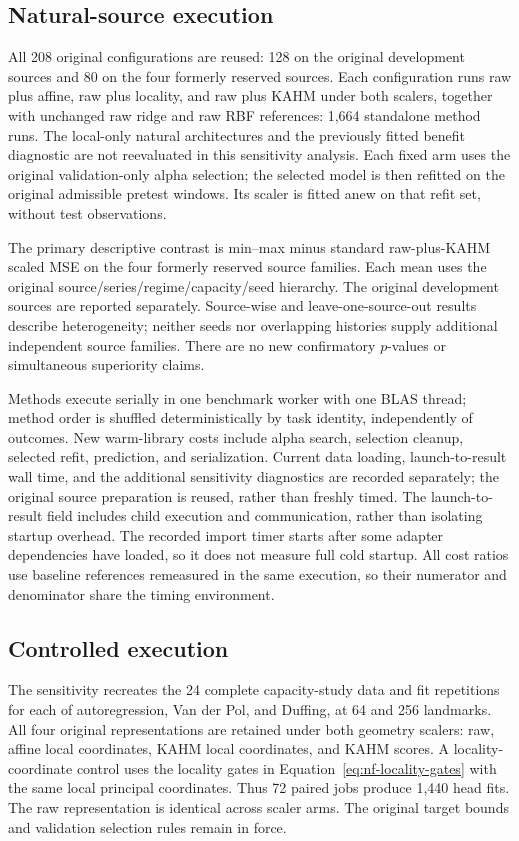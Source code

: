 \subsection{Natural-source execution}
All 208 original configurations are reused: 128 on the original development
sources and 80 on the four formerly reserved sources. Each configuration runs
raw plus affine, raw plus locality, and raw plus KAHM under both scalers,
together with unchanged raw ridge and raw RBF references: 1,664 standalone
method runs. The local-only natural architectures and the previously fitted benefit diagnostic are not reevaluated in this
sensitivity analysis. Each fixed arm uses the
original validation-only alpha selection; the selected model is then refitted
on the original admissible pretest windows. Its scaler is fitted anew on that
refit set, without test observations.

The primary descriptive contrast is min--max minus standard raw-plus-KAHM
scaled MSE on the four formerly reserved source families. Each mean uses the
original source/series/regime/capacity/seed hierarchy. The original development
sources are reported separately. Source-wise and leave-one-source-out results
describe heterogeneity; neither seeds nor overlapping histories supply
additional independent source families. There are no new confirmatory
$p$-values or simultaneous superiority claims.

Methods execute serially in one benchmark worker with one BLAS thread;
method order is shuffled deterministically by task identity, independently
of outcomes. New warm-library costs include alpha search, selection cleanup,
selected refit, prediction, and serialization. Current data loading,
launch-to-result wall time, and the additional sensitivity diagnostics are
recorded separately; the original source preparation is reused, rather than
freshly timed. The launch-to-result field includes child execution and communication, rather
than isolating startup overhead. The recorded import timer starts after some
adapter dependencies have loaded, so it does not measure full cold startup.
All cost ratios use baseline references remeasured in the same
execution, so their numerator and denominator share the timing environment.

\subsection{Controlled execution}
The sensitivity recreates the 24 complete capacity-study data and fit
repetitions for
each of autoregression, Van der Pol, and Duffing, at 64 and 256 landmarks.
All four original representations are retained under both geometry scalers:
raw, affine local coordinates, KAHM local coordinates, and KAHM scores.
A locality-coordinate control uses the locality gates in
Equation~\eqref{eq:nf-locality-gates} with the same local principal coordinates.
Thus 72 paired jobs produce 1,440 head fits. The raw representation is
identical across scaler arms. The original target bounds and validation
selection rules remain in force.

